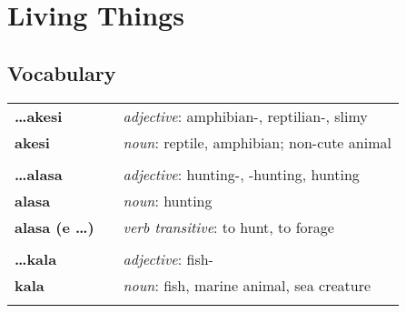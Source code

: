 \section{Living Things}
%
\subsection*{Vocabulary}
%
\begin{supertabular}{p{2,5cm}|ll}
    \textbf{\dots akesi}      &  & \textit{adjective}: amphibian-, reptilian-, slimy                                                 \\ %
    \textbf{akesi}            &  & \textit{noun}: reptile, amphibian; non-cute animal                                                \\ %
                              &  &                                                                                                   \\ %
    \textbf{\dots alasa}      &  & \textit{adjective}: hunting-, -hunting, hunting                                                   \\ %
    \textbf{alasa}            &  & \textit{noun}: hunting                                                                            \\ %
    \textbf{alasa (e \dots)}  &  & \textit{verb transitive}: to hunt, to forage                                                      \\ %
                              &  &                                                                                                   \\ %
    \textbf{\dots kala}       &  & \textit{adjective}: fish-                                                                         \\ %
    \textbf{kala}             &  & \textit{noun}: fish, marine animal, sea creature                                                  \\ %
                              &  &                                                                                                   \\ %

\end{supertabular}
